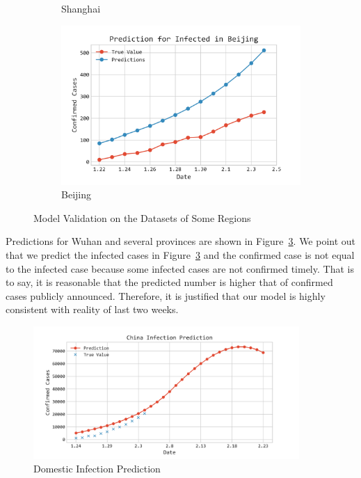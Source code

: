 \documentclass[12pt]{mcmthesis}
\begin{document}
\begin{figure}[htbp]
\begin{subfigure}[t]{0.45\textwidth}
        \caption{Shanghai}
        \label{fig:Val_Shanghai}
    \end{subfigure}
    \begin{subfigure}[t]{0.45\textwidth}
        \includegraphics[width=1.0\textwidth]{figure/Beijing_Validation.png}
        \caption{Beijing}
        \label{fig:Val_Beijing}
    \end{subfigure}
    \caption{Model Validation on the Datasets of Some Regions}
    \label{fig:Val}
\end{figure}

 Predictions for Wuhan and several provinces are shown in Figure~\ref{fig:Val}. We point out that we predict the infected cases in Figure~\ref{fig:Val} and the confirmed case is not equal to the infected case because some infected cases are not confirmed timely. That is to say, it is reasonable that the predicted number is higher that of confirmed cases publicly announced. Therefore, it is justified that our model is highly consistent with reality of last two weeks.

\begin{figure}[hb]
    \centering
    \includegraphics[width=0.9\textwidth]{053/figure/China_Total_Prediction.png}
    \caption{Domestic Infection Prediction}
    \label{fig:domestic}
\end{figure}
\end{document}
